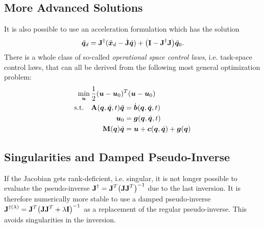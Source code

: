 		\subsection{More Advanced Solutions}
			It is also possible to use an acceleration formulation which has the solution
			\begin{equation*}
				\ddot{\bm{q}}_d = \bm{\mathrm{J}}^\dagger ( \ddot{\bm{x}}_d - \dot{\bm{\mathrm{J}}} \dot{\bm{q}} ) + \big( \bm{\mathrm{I}} - \bm{\mathrm{J}}^\dagger \bm{\mathrm{J}} \big) \ddot{\bm{q}}_0.
			\end{equation*}
			There is a whole class of so-called \emph{operational space control laws}, i.e. task-space control laws, that can all be derived from the following most general optimization problem:
			\begin{equation*}
				\begin{aligned}
					\min_{\bm{u}} \,& \frac{1}{2} (\bm{u} - \bm{u}_0)^T (\bm{u} - \bm{u}_0) \\
					\mathrm{s.t.} \quad&
						\begin{aligned}[t]
							\bm{\mathrm{A}}(\bm{q}, \dot{\bm{q}}, t) \ddot{\bm{q}} &= \dot{\bm{b}}(\bm{q}, \dot{\bm{q}}, t) \\
							                                        \bm{u}_0 &= \bm{g}(\bm{q}, \dot{\bm{q}}, t) \\
							                  \bm{\mathrm{M}}(\bm{q}) \ddot{\bm{q}} &= \bm{u} + \bm{c}(\bm{q}, \dot{\bm{q}}) + \bm{g}(\bm{q})
						\end{aligned}
				\end{aligned}
			\end{equation*}

		\subsection{Singularities and Damped Pseudo-Inverse}
			If the Jacobian gets rank-deficient, i.e. singular, it is not longer possible to evaluate the pseudo-inverse \( \bm{\mathrm{J}}^\dagger = \bm{\mathrm{J}}^T \big( \bm{\mathrm{J}} \bm{\mathrm{J}}^T \big)^{-1} \) due to the last inversion. It is therefore numerically more stable to use a damped pseudo-inverse \( \bm{\mathrm{J}}^{\dagger(\lambda)} = \bm{\mathrm{J}}^T \big( \bm{\mathrm{J}} \bm{\mathrm{J}}^T + \lambda \bm{\mathrm{I}} \big)^{-1} \) as a replacement of the regular pseudo-inverse. This avoids singularities in the inversion.

